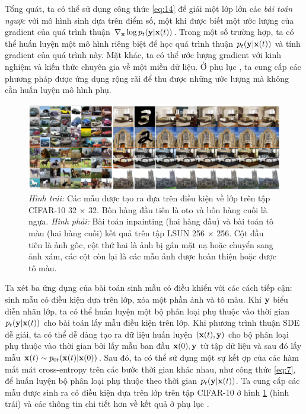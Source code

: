\documentclass{article} %
\begin{document}
Tổng quát, ta có thể sử dụng công thức \ref{eq:14} để giải một lớp lớn các \textit{bài toán ngược} với mô hình sinh dựa trên điểm số,
một khi được biết một ước lượng của gradient của quá trình thuận $\nabla_{\bold{x}} \log p_t (\bold{y} \vert \bold{x}(t))$.
Trong một số trường hợp, ta có thể huấn luyện một mô hình riêng biệt để học quá trình thuận $p_t(\bold{y} \vert \bold{x}(t))$ và tính gradient của quá trình này.
Mặt khác, ta có thể ước lượng gradient với kinh nghiệm và kiến thức chuyên gia về một miền dữ liệu.
Ở phụ lục , ta cung cấp các phương pháp được ứng dụng rộng rãi để thu được những ước lượng mà không cần huấn luyện mô hình phụ.

\begin{figure}[h!]
    \centering
    \includegraphics[width=0.9\linewidth]{figures/4.png}
    \caption{\textit{Hình trái:} Các mẫu được tạo ra dựa trên điều kiện về lớp trên tập CIFAR-10 32 $\times$ 32.
    Bốn hàng đầu tiên là oto và bốn hàng cuối là ngựa.
    \textit{Hình phải:} Bài toán inpainting (hai hàng đầu) và bài toán tô màu (hai hàng cuối) kết quả trên tập LSUN 256 $\times$ 256.
    Cột đầu tiên là ảnh gốc, cột thứ hai là ảnh bị gán mặt nạ hoặc chuyển sang ảnh xám, các cột còn lại là các mẫu ảnh được hoàn thiện hoặc được tô màu.}
    \label{fig:4}
\end{figure}

Ta xét ba ứng dụng của bài toán sinh mẫu có điều khiển với các cách tiếp cận:
sinh mẫu có điều kiện dựa trên lớp, xóa một phần ảnh và tô màu.
Khi $\bold{y}$ biểu diễn nhãn lớp, ta có thể huấn luyện một bộ phân loại phụ thuộc vào thời gian $p_t(\bold{y} \vert \bold{x}(t))$ cho bài toán lấy mẫu điều kiện trên lớp.
Khi phương trình thuận SDE dễ giải, ta có thể dễ dàng tạo ra dữ liệu huấn luyện $(\bold{x}(t), \bold{y})$ cho bộ phân loại phụ thuộc vào thời gian bởi lấy mẫu ban đầu $\bold{x}(0), \bold{y}$ từ tập dữ liệu và sau đó lấy mẫu $\bold{x}(t) \sim p_{0t} (\bold{x}(t) \vert \bold{x}(0))$.
Sau đó, ta có thể sử dụng một sự kết ợp của các hàm mất mát cross-entropy trên các bước thời gian khác nhau, như công thức \ref{eq:7}, để huấn luyện bộ phân loại phụ thuộc theo thời gian $p_t(\bold{y} \vert \bold{x}(t))$.
Ta cung cấp các mẫu được sinh ra có điều kiện dựa trên lớp trên tập CIFAR-10 ở hình \ref{fig:4} (hình trái) và các thông tin chi tiết hơn về kết quả ở phụ lục .
\end{document}
